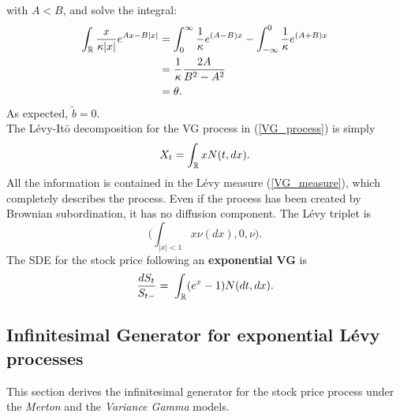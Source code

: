 with $A<B$, and solve the integral:
\begin{align*}
 \int_{\mathbb{R}} \frac{x}{\kappa |x|} e^{Ax-B|x|} &= \int_{0}^{\infty} \frac{1}{\kappa} e^{(A-B)x} 
 - \int_{-\infty}^0 \frac{1}{\kappa} e^{(A+B)x} \\
 &= \frac{1}{\kappa} \frac{2A}{B^2-A^2} \\
 &= \theta.
\end{align*}
As expected, $\tilde b = 0$. \\
The Lévy-It\={o} decomposition for the VG process in (\ref{VG_process}) is simply
\begin{equation}
X_t = \int_{\mathbb{R}} x N(t,dx). 
\end{equation}
All the information is contained in the Lévy measure (\ref{VG_measure}),
which completely describes the process. Even if the process has been created by Brownian
subordination, it has no diffusion component.  
The L\'evy triplet is
\begin{equation}\label{VG_triplet}
 \biggl( \int_{|x|<1} x \nu(dx), 0, \nu \biggr).
\end{equation}
The SDE for the stock price following an \textbf{exponential VG} is 
\begin{equation}\label{VG_sde}
 \frac{d S_t}{S_{t-}}  = \; \int_{\mathbb{R}} (e^{x} - 1) N(dt,dx).  
\end{equation}


\subsection{Infinitesimal Generator for exponential Lévy processes} 

This section derives the infinitesimal generator for the stock price process under the \emph{Merton} and the \emph{Variance Gamma} models.\\

